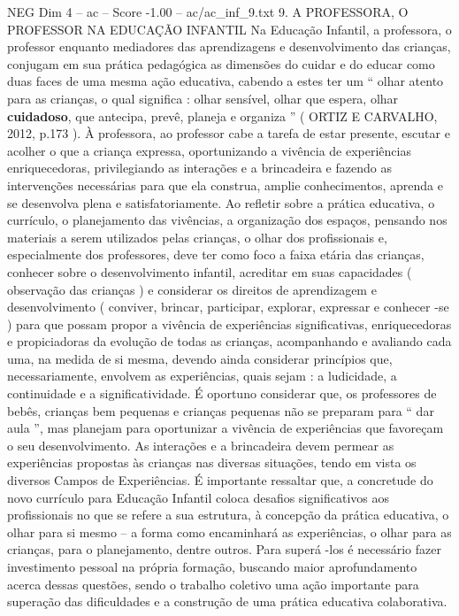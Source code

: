 \begin{textsample}{NEG Dim 4 – ac – Score -1.00 – ac/ac\_inf\_9.txt}  \label{ex:f4_neg_049}
9.
A PROFESSORA, O PROFESSOR NA EDUCAÇÃO INFANTIL Na Educação Infantil, a professora, o professor enquanto mediadores das aprendizagens e desenvolvimento das crianças, conjugam em sua prática pedagógica as dimensões do cuidar e do educar como duas faces de uma mesma ação educativa, cabendo a estes ter um “ olhar atento para as crianças, o qual significa : olhar sensível, olhar que espera, olhar \textbf{cuidadoso}, que antecipa, prevê, planeja e organiza ” ( ORTIZ E CARVALHO, 2012, p.173 ).
À professora, ao professor cabe a tarefa de estar presente, escutar e acolher o que a criança expressa, oportunizando a vivência de experiências enriquecedoras, privilegiando as interações e a brincadeira e fazendo as intervenções necessárias para que ela construa, amplie conhecimentos, aprenda e se desenvolva plena e satisfatoriamente.
Ao refletir sobre a prática educativa, o currículo, o planejamento das vivências, a organização dos espaços, pensando nos materiais a serem utilizados pelas crianças, o olhar dos profissionais e, especialmente dos professores, deve ter como foco a faixa etária das crianças, conhecer sobre o desenvolvimento infantil, acreditar em suas capacidades ( observação das crianças ) e considerar os direitos de aprendizagem e desenvolvimento ( conviver, brincar, participar, explorar, expressar e conhecer -se ) para que possam propor a vivência de experiências significativas, enriquecedoras e propiciadoras da evolução de todas as crianças, acompanhando e avaliando cada uma, na medida de si mesma, devendo ainda considerar princípios que, necessariamente, envolvem as experiências, quais sejam : a ludicidade, a continuidade e a significatividade.
É oportuno considerar que, os professores de bebês, crianças bem pequenas e crianças pequenas não se preparam para “ dar aula ”, mas planejam para oportunizar a vivência de experiências que favoreçam o seu desenvolvimento.
As interações e a brincadeira devem permear as experiências propostas às crianças nas diversas situações, tendo em vista os diversos Campos de Experiências.
É importante ressaltar que, a concretude do novo currículo para Educação Infantil coloca desafios significativos aos profissionais no que se refere a sua estrutura, à concepção da prática educativa, o olhar para si mesmo – a forma como encaminhará as experiências, o olhar para as crianças, para o planejamento, dentre outros.
Para superá -los é necessário fazer investimento pessoal na própria formação, buscando maior aprofundamento acerca dessas questões, sendo o trabalho coletivo uma ação importante para superação das dificuldades e a construção de uma prática educativa colaborativa.

\end{textsample}
